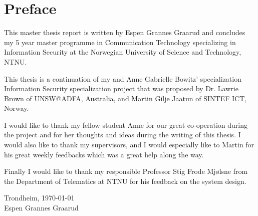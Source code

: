 \chapter*{Preface}

This master thesis report is written by Espen Grannes Graarud and concludes my 5
year master programme in Communication Technology specializing in Information
Security at the Norwegian University of Science and Technology, NTNU.

This thesis is a continuation of my and Anne Gabrielle Bowitz' specialization
Information Security specialization project that was proposed by Dr. Lawrie
Brown of UNSW@ADFA, Australia, and Martin Gilje Jaatun of SINTEF ICT, Norway.

I would like to thank my fellow student Anne for our great co-operation during
the project and for her thoughts and ideas during the writing of this thesis. I
would also like to thank my supervisors, and I would especially like to Martin
for his great weekly feedbacks which was a great help along the way.

Finally I would like to thank my responsible Professor Stig Frode Mj{\o}lsne
from the Department of Telematics at NTNU for his feedback on the system design.

\begin{center}
\vspace{4cm}
\noindent Trondheim, \today
\vspace{2cm}
\\Espen Grannes Graarud
\end{center}
